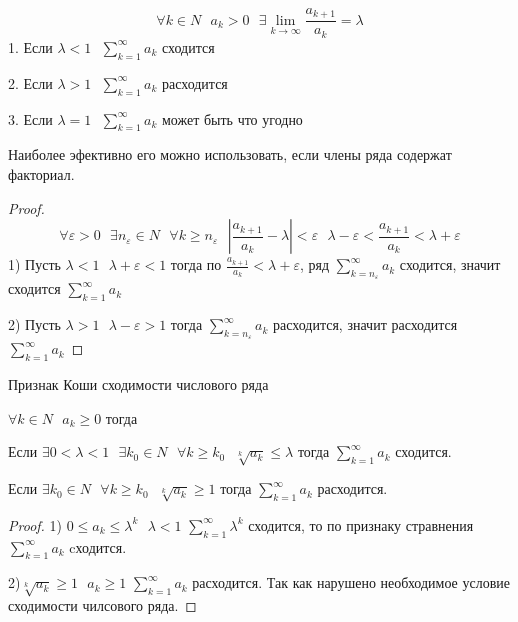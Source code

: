 \begin{block}
  $$
  \forall k \in N ~~~ a_k > 0 ~~~
  \exists \lim_{k \to \infty} \frac{a_{k+1}}{a_k} = \lambda
  $$
  1. Если $\lambda < 1 ~~~ \sum_{k=1}^{\infty} a_k$ сходится

  2. Если $\lambda > 1 ~~~ \sum_{k=1}^{\infty} a_k$ расходится

  3. Если $\lambda = 1 ~~~ \sum_{k=1}^{\infty} a_k$ может быть что угодно

  Наиболее эфективно его можно использовать, если члены ряда содержат факториал.
\end{block}

\begin{proof}
  $$
  \forall \varepsilon > 0 ~~~
  \exists n_{\varepsilon} \in N ~~~
  \forall k \ge n_{\varepsilon} ~~~
  \left| \frac{a_{k+1}}{a_k} - \lambda \right| < \varepsilon ~~~
  \lambda - \varepsilon < \frac{a_{k+1}}{a_k} < \lambda + \varepsilon
  $$
  1) Пусть $\lambda < 1 ~~~ \lambda + \varepsilon < 1$ тогда по
  $\frac{a_{k+1}}{a_k} < \lambda + \varepsilon$, ряд
  $\sum_{k = n_{\varepsilon}}^{\infty} a_k$ сходится, значит сходится
  $\sum_{k = 1}^{\infty} a_k$

  2) Пусть $\lambda > 1 ~~~ \lambda - \varepsilon > 1$ тогда
  $\sum_{k = n_{\varepsilon}}^{\infty} a_k$ расходится, значит расходится
  $\sum_{k = 1}^{\infty} a_k$
\end{proof}

\begin{title}[\Large]
  Признак Коши сходимости числового ряда
\end{title}

\begin{block}
  $\forall k \in N ~~~ a_k \ge 0 $ тогда

  Если $\exists 0 < \lambda < 1 ~~~ \exists k_0 \in N ~~~ \forall k \ge k_0 ~~~
  \sqrt[k]{a_k} \le \lambda$ тогда $\sum_{k=1}^{\infty} a_k$ сходится.

  Если $\exists k_0 \in N ~~~ \forall k \ge k_0 ~~~ \sqrt[k]{a_k} \ge 1$ тогда
  $\sum_{k=1}^{\infty} a_k$ расходится.
\end{block}

\begin{proof}
  1) $0 \le a_k \le \lambda^k ~~~ \lambda < 1$ $\sum_{k=1}^{\infty} \lambda^k$
  сходится, то по признаку стравнения $\sum_{k=1}^{\infty} a_k$ cходится.

  2)$\sqrt[k]{a_k} \ge 1 ~~~ a_k \ge 1$ $\sum_{k=1}^{\infty} a_k$ расходится.
  Так как нарушено необходимое условие сходимости чилсового ряда.
\end{proof}


